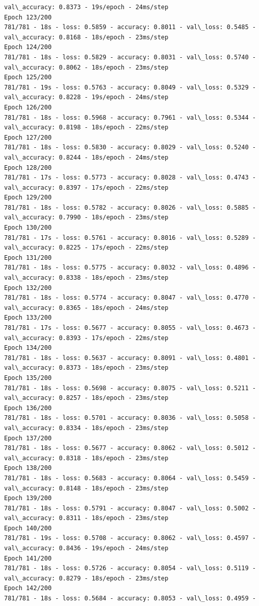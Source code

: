 \documentclass[11pt]{article}
\begin{document}
\begin{Verbatim}[commandchars=\\\{\}]
val\_accuracy: 0.8373 - 19s/epoch - 24ms/step
Epoch 123/200
781/781 - 18s - loss: 0.5859 - accuracy: 0.8011 - val\_loss: 0.5485 -
val\_accuracy: 0.8168 - 18s/epoch - 23ms/step
Epoch 124/200
781/781 - 18s - loss: 0.5829 - accuracy: 0.8031 - val\_loss: 0.5740 -
val\_accuracy: 0.8062 - 18s/epoch - 23ms/step
Epoch 125/200
781/781 - 19s - loss: 0.5763 - accuracy: 0.8049 - val\_loss: 0.5329 -
val\_accuracy: 0.8228 - 19s/epoch - 24ms/step
Epoch 126/200
781/781 - 18s - loss: 0.5968 - accuracy: 0.7961 - val\_loss: 0.5344 -
val\_accuracy: 0.8198 - 18s/epoch - 22ms/step
Epoch 127/200
781/781 - 18s - loss: 0.5830 - accuracy: 0.8029 - val\_loss: 0.5240 -
val\_accuracy: 0.8244 - 18s/epoch - 24ms/step
Epoch 128/200
781/781 - 17s - loss: 0.5773 - accuracy: 0.8028 - val\_loss: 0.4743 -
val\_accuracy: 0.8397 - 17s/epoch - 22ms/step
Epoch 129/200
781/781 - 18s - loss: 0.5782 - accuracy: 0.8026 - val\_loss: 0.5885 -
val\_accuracy: 0.7990 - 18s/epoch - 23ms/step
Epoch 130/200
781/781 - 17s - loss: 0.5761 - accuracy: 0.8016 - val\_loss: 0.5289 -
val\_accuracy: 0.8225 - 17s/epoch - 22ms/step
Epoch 131/200
781/781 - 18s - loss: 0.5775 - accuracy: 0.8032 - val\_loss: 0.4896 -
val\_accuracy: 0.8338 - 18s/epoch - 23ms/step
Epoch 132/200
781/781 - 18s - loss: 0.5774 - accuracy: 0.8047 - val\_loss: 0.4770 -
val\_accuracy: 0.8365 - 18s/epoch - 24ms/step
Epoch 133/200
781/781 - 17s - loss: 0.5677 - accuracy: 0.8055 - val\_loss: 0.4673 -
val\_accuracy: 0.8393 - 17s/epoch - 22ms/step
Epoch 134/200
781/781 - 18s - loss: 0.5637 - accuracy: 0.8091 - val\_loss: 0.4801 -
val\_accuracy: 0.8373 - 18s/epoch - 23ms/step
Epoch 135/200
781/781 - 18s - loss: 0.5698 - accuracy: 0.8075 - val\_loss: 0.5211 -
val\_accuracy: 0.8257 - 18s/epoch - 23ms/step
Epoch 136/200
781/781 - 18s - loss: 0.5701 - accuracy: 0.8036 - val\_loss: 0.5058 -
val\_accuracy: 0.8334 - 18s/epoch - 23ms/step
Epoch 137/200
781/781 - 18s - loss: 0.5677 - accuracy: 0.8062 - val\_loss: 0.5012 -
val\_accuracy: 0.8318 - 18s/epoch - 23ms/step
Epoch 138/200
781/781 - 18s - loss: 0.5683 - accuracy: 0.8064 - val\_loss: 0.5459 -
val\_accuracy: 0.8148 - 18s/epoch - 23ms/step
Epoch 139/200
781/781 - 18s - loss: 0.5791 - accuracy: 0.8047 - val\_loss: 0.5002 -
val\_accuracy: 0.8311 - 18s/epoch - 23ms/step
Epoch 140/200
781/781 - 19s - loss: 0.5708 - accuracy: 0.8062 - val\_loss: 0.4597 -
val\_accuracy: 0.8436 - 19s/epoch - 24ms/step
Epoch 141/200
781/781 - 18s - loss: 0.5726 - accuracy: 0.8054 - val\_loss: 0.5119 -
val\_accuracy: 0.8279 - 18s/epoch - 23ms/step
Epoch 142/200
781/781 - 18s - loss: 0.5684 - accuracy: 0.8053 - val\_loss: 0.4959 -

\end{Verbatim}
\end{document}
